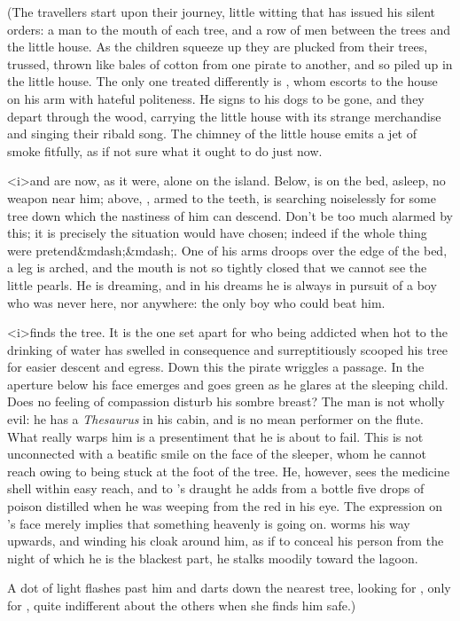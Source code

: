 \begin{stagedir}
(The travellers start upon their journey, little witting that \hook has issued his silent orders:
a man to the mouth of each tree, and a row of men between the trees and the little house.
As the children squeeze up they are plucked from their trees,
trussed, thrown like bales of cotton from one pirate to another, and so piled up in the little house.
The only one treated differently is \wendy, whom \hook escorts to the house on his arm with hateful politeness.
He signs to his dogs to be gone, and they depart through the wood,
carrying the little house with its strange merchandise and singing their ribald song.
The chimney of the little house emits a jet of smoke fitfully, as if not sure what it ought to do just now.

\hook <i>and \peter are now, as it were, alone on the island.
Below, \peter is on the bed, asleep, no weapon near him;
above, \hook, armed to the teeth, is searching noiselessly for some tree down which the nastiness of him can descend.
Don't be too much alarmed by this; it is precisely the situation \peter would have chosen;
indeed if the whole thing were pretend&mdash;&mdash;.
One of his arms droops over the edge of the bed, a leg is arched,
and the mouth is not so tightly closed that we cannot see the little pearls.
He is dreaming, and in his dreams he is always in pursuit of a boy who was never here, nor anywhere:
the only boy who could beat him.

\hook <i>finds the tree.
It is the one set apart for \slightly who being addicted when hot to the drinking of water has swelled in consequence
and surreptitiously scooped his tree for easier descent and egress.
Down this the pirate wriggles a passage.
In the aperture below his face emerges and goes green as he glares at the sleeping child.
Does no feeling of compassion disturb his sombre breast?
The man is not wholly evil: he has a \emph{Thesaurus} in his cabin, and is no mean performer on the flute.
What really warps him is a presentiment that he is about to fail.
This is not unconnected with a beatific smile on the face of the sleeper,
whom he cannot reach owing to being stuck at the foot of the tree.
He, however, sees the medicine shell within easy reach,
and to \wendy's draught he adds from a bottle five drops of poison
distilled when he was weeping from the red in his eye.
The expression on \peter's face merely implies that something heavenly is going on.
\hook worms his way upwards, and winding his cloak around him,
as if to conceal his person from the night of which he is the blackest part,
he stalks moodily toward the lagoon.

A dot of light flashes past him and darts down the nearest tree, looking for \peter, only for \peter,
quite indifferent about the others when she finds him safe.)
\end{stagedir}


